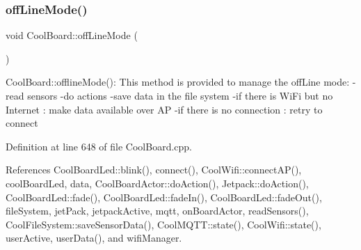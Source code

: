 \subsubsection{\texorpdfstring{off\+Line\+Mode()}{offLineMode()}}
{\footnotesize\ttfamily void Cool\+Board\+::off\+Line\+Mode (\begin{DoxyParamCaption}{ }\end{DoxyParamCaption})}

Cool\+Board\+::offline\+Mode()\+: This method is provided to manage the off\+Line mode\+: -\/read sensors -\/do actions -\/save data in the file system -\/if there is Wi\+Fi but no Internet \+: make data available over AP -\/if there is no connection \+: retry to connect 

Definition at line 648 of file Cool\+Board.\+cpp.



References Cool\+Board\+Led\+::blink(), connect(), Cool\+Wifi\+::connect\+A\+P(), cool\+Board\+Led, data, Cool\+Board\+Actor\+::do\+Action(), Jetpack\+::do\+Action(), Cool\+Board\+Led\+::fade(), Cool\+Board\+Led\+::fade\+In(), Cool\+Board\+Led\+::fade\+Out(), file\+System, jet\+Pack, jetpack\+Active, mqtt, on\+Board\+Actor, read\+Sensors(), Cool\+File\+System\+::save\+Sensor\+Data(), Cool\+M\+Q\+T\+T\+::state(), Cool\+Wifi\+::state(), user\+Active, user\+Data(), and wifi\+Manager.

